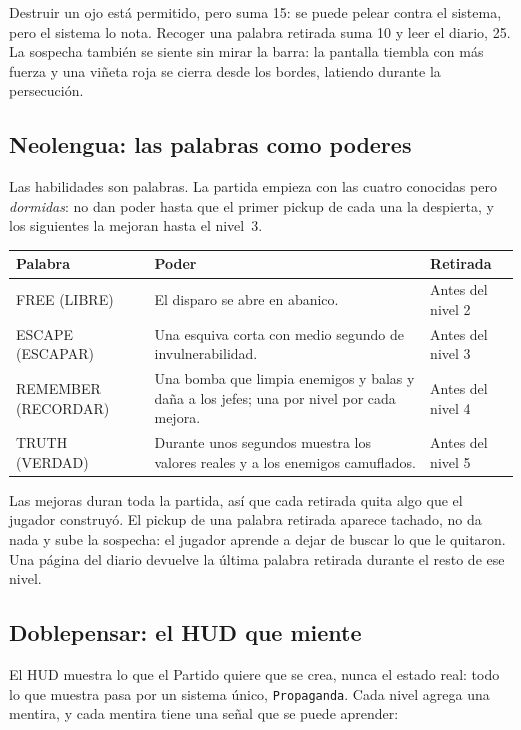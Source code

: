 \documentclass[11pt,a4paper]{article}
\begin{document}
Destruir un ojo está permitido, pero suma 15: se puede pelear contra el sistema, pero el sistema lo nota. Recoger una palabra retirada suma 10 y leer el diario, 25. La sospecha también se siente sin mirar la barra: la pantalla tiembla con más fuerza y una viñeta roja se cierra desde los bordes, latiendo durante la persecución.

\subsection{Neolengua: las palabras como poderes}

Las habilidades son palabras. La partida empieza con las cuatro conocidas pero \emph{dormidas}: no dan poder hasta que el primer pickup de cada una la despierta, y los siguientes la mejoran hasta el nivel~3.

\begin{center}
\begin{tabularx}{\textwidth}{>{\machine\large}l L l}
  \toprule
  \textbf{Palabra} & \textbf{Poder} & \textbf{Retirada} \\
  \midrule
  FREE (LIBRE) & El disparo se abre en abanico. & Antes del nivel 2 \\
  ESCAPE (ESCAPAR) & Una esquiva corta con medio segundo de invulnerabilidad. & Antes del nivel 3 \\
  REMEMBER (RECORDAR) & Una bomba que limpia enemigos y balas y daña a los jefes; una por nivel por cada mejora. & Antes del nivel 4 \\
  TRUTH (VERDAD) & Durante unos segundos muestra los valores reales y a los enemigos camuflados. & Antes del nivel 5 \\
  \bottomrule
\end{tabularx}
\end{center}

Las mejoras duran toda la partida, así que cada retirada quita algo que el jugador construyó. El pickup de una palabra retirada aparece tachado, no da nada y sube la sospecha: el jugador aprende a dejar de buscar lo que le quitaron. Una página del diario devuelve la última palabra retirada durante el resto de ese nivel.

\subsection{Doblepensar: el HUD que miente}

El HUD muestra lo que el Partido quiere que se crea, nunca el estado real: todo lo que muestra pasa por un sistema único, \texttt{Propaganda}. Cada nivel agrega una mentira, y cada mentira tiene una señal que se puede aprender:
\end{document}
